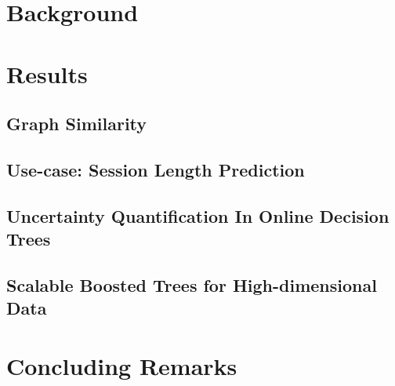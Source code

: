 \documentclass[g5paper,twoside,phd,electronic]{kthesis}
\begin{document}
\frontmatter
\maketitle
\makecopyright
\makededication



\tableofcontents*
\listoffigures
\listoftables
\listofalgorithms
\mainmatter

\newpage
\part{Background}
\label{part:bg}

\newpage

\newpage

\newpage

\newpage
%
\part{Results}
\label{part:results}
\chapter{Graph Similarity}
\label{ch:concepts}

\newpage
\chapter{Use-case: Session Length Prediction}
\label{ch:session-length}

\newpage
\chapter{Uncertainty Quantification In Online Decision Trees}
\label{ch:uncertain-trees}

\newpage
\chapter{Scalable Boosted Trees for High-dimensional Data}
\label{ch:boosted-trees}

\newpage
\part{Concluding Remarks}
\label{part:conclusion}

\newpage

\backmatter
\printindex

\end{document}
